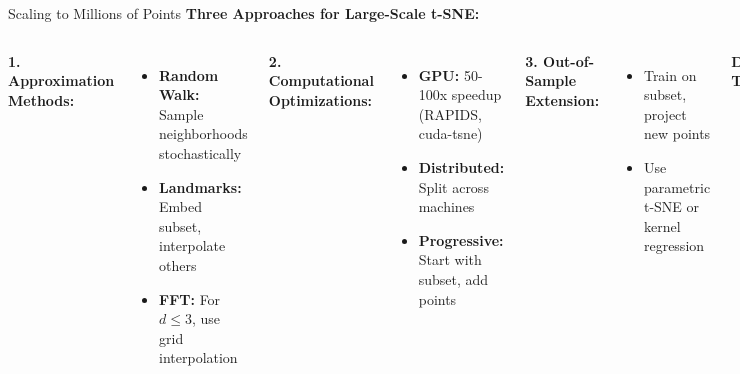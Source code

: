 \documentclass[aspectratio=169]{beamer}
\begin{document}
\begin{frame}{Scaling to Millions of Points}
\textbf{Three Approaches for Large-Scale t-SNE:}

\begin{columns}
\textbf{1. Approximation Methods:}
\begin{itemize}
\item \textbf{Random Walk:} Sample neighborhoods stochastically
\item \textbf{Landmarks:} Embed subset, interpolate others
\item \textbf{FFT:} For $d \leq 3$, use grid interpolation
\end{itemize}

\textbf{2. Computational Optimizations:}
\begin{itemize}
\item \textbf{GPU:} 50-100x speedup (RAPIDS, cuda-tsne)
\item \textbf{Distributed:} Split across machines
\item \textbf{Progressive:} Start with subset, add points
\end{itemize}

\textbf{3. Out-of-Sample Extension:}
\begin{itemize}
\item Train on subset, project new points
\item Use parametric t-SNE or kernel regression
\end{itemize}

\begin{center}
\textbf{Decision Tree:}
\end{center}

\textbf{Implementation Libraries:}
\begin{itemize}
\item \texttt{openTSNE}: All methods
\item \texttt{FIt-SNE}: FFT acceleration  
\item \texttt{RAPIDS}: GPU implementation
\end{itemize}
\end{columns}
\end{frame}
\end{document}

